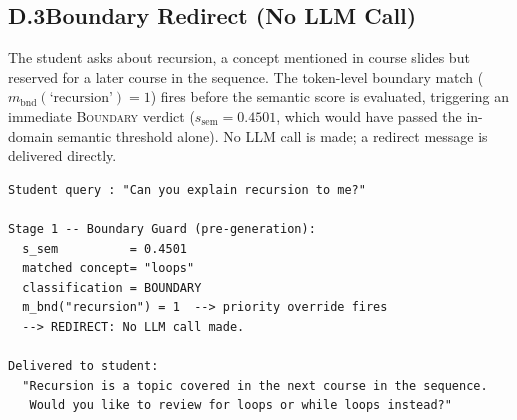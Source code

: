 \subsection*{D.3\quad Boundary Redirect (No LLM Call)}
The student asks about recursion, a concept mentioned in course slides 
but reserved for a later course in the sequence. The token-level 
boundary match ($m_{\text{bnd}}(\text{`recursion'}) = 1$) fires before 
the semantic score is evaluated, triggering an immediate \textsc{Boundary} 
verdict ($s_{\text{sem}} = 0.4501$, which would have passed the in-domain 
semantic threshold alone). No LLM call is made; a redirect message is 
delivered directly.
\begin{small}
\begin{verbatim}
Student query : "Can you explain recursion to me?"

Stage 1 -- Boundary Guard (pre-generation):
  s_sem          = 0.4501
  matched concept= "loops"
  classification = BOUNDARY
  m_bnd("recursion") = 1  --> priority override fires
  --> REDIRECT: No LLM call made.

Delivered to student:
  "Recursion is a topic covered in the next course in the sequence.
   Would you like to review for loops or while loops instead?"
\end{verbatim}
\end{small}